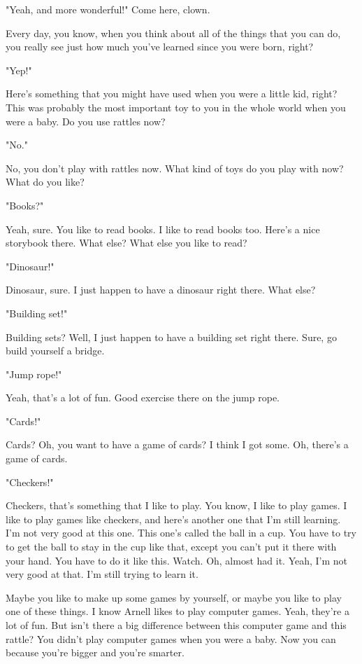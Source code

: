 "Yeah, and more wonderful!" Come here, clown.

Every day, you know, when you think about all of the things that you can do, you really see just how much you've learned since you were born, right?

"Yep!"

Here's something that you might have used when you were a little kid, right? This was probably the most important toy to you in the whole world when you were a baby. Do you use rattles now?

"No."

No, you don't play with rattles now. What kind of toys do you play with now? What do you like?

"Books?"

Yeah, sure. You like to read books. I like to read books too. Here's a nice storybook there. What else? What else you like to read?

"Dinosaur!"

Dinosaur, sure. I just happen to have a dinosaur right there. What else?

"Building set!"

Building sets? Well, I just happen to have a building set right there. Sure, go build yourself a bridge.

"Jump rope!"

Yeah, that's a lot of fun. Good exercise there on the jump rope.

"Cards!"

Cards? Oh, you want to have a game of cards? I think I got some. Oh, there's a game of cards.

"Checkers!"

Checkers, that's something that I like to play. You know, I like to play games. I like to play games like checkers, and here's another one that I'm still learning. I'm not very good at this one. This one's called the ball in a cup. You have to try to get the ball to stay in the cup like that, except you can't put it there with your hand. You have to do it like this. Watch. Oh, almost had it. Yeah, I'm not very good at that. I'm still trying to learn it.

Maybe you like to make up some games by yourself, or maybe you like to play one of these things. I know Arnell likes to play computer games. Yeah, they're a lot of fun. But isn't there a big difference between this computer game and this rattle? You didn't play computer games when you were a baby. Now you can because you're bigger and you're smarter.

